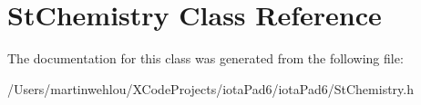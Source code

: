 \hypertarget{interface_st_chemistry}{
\section{StChemistry Class Reference}
\label{interface_st_chemistry}
}


The documentation for this class was generated from the following file:\begin{DoxyCompactItemize}
\item 
/Users/martinwehlou/XCodeProjects/iotaPad6/iotaPad6/StChemistry.h\end{DoxyCompactItemize}
